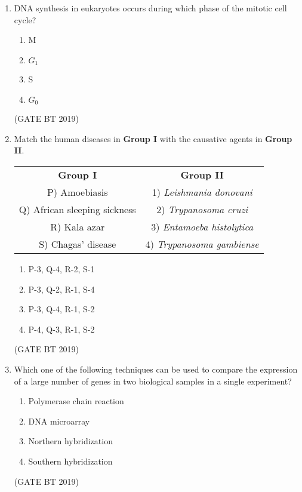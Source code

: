 \documentclass[journal,12pt,onecolumn]{IEEEtran}
\begin{document}
\begin{enumerate}
\item DNA synthesis in eukaryotes occurs during which phase of the mitotic cell cycle?
\begin{multicols}{4}
\begin{enumerate}
\item M
\item $G_1$
\item S
\item $G_0$
\end{enumerate}
\end{multicols}\hfill(GATE BT 2019)

\item Match the human diseases in \textbf{Group I} with the causative agents in \textbf{Group II}.

\begin{table}[H]
\begin{tabular}{cc}
\textbf{Group I} & \textbf{Group II} \\[6pt]
P) Amoebiasis & 1) \textit{Leishmania donovani} \\ 
Q) African sleeping sickness & 2) \textit{Trypanosoma cruzi} \\ 
R) Kala azar & 3) \textit{Entamoeba histolytica} \\ 
S) Chagas’ disease & 4) \textit{Trypanosoma gambiense} \\ 
\end{tabular}
\end{table}

\begin{multicols}{2}
\begin{enumerate}
\item P-3, Q-4, R-2, S-1
\item P-3, Q-2, R-1, S-4
\item P-3, Q-4, R-1, S-2
\item P-4, Q-3, R-1, S-2
\end{enumerate}
\end{multicols}\hfill(GATE BT 2019)


\item Which one of the following techniques can be used to compare the expression of a large number of genes in two biological samples in a single experiment?

\begin{multicols}{2}
\begin{enumerate}
\item Polymerase chain reaction
\item DNA microarray
\item Northern hybridization
\item Southern hybridization
\end{enumerate}
\end{multicols}\hfill(GATE BT 2019)


\end{enumerate}
\end{document}

